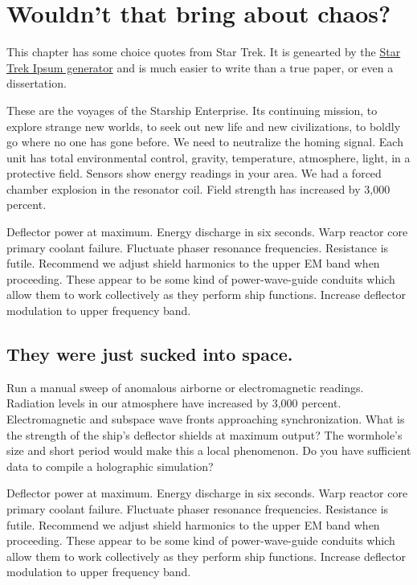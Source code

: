 
\chapter{Wouldn't that bring about chaos?}\label{chap:ipsum}

This chapter has some choice quotes from Star Trek. 
It is genearted by the \href{http://vlad-saling.github.io/star-trek-ipsum/}{Star Trek Ipsum generator} and is much easier to write than a true paper, or even a dissertation.

These are the voyages of the Starship Enterprise. Its continuing mission, to explore strange new worlds, to seek out new life and new civilizations, to boldly go where no one has gone before. We need to neutralize the homing signal. Each unit has total environmental control, gravity, temperature, atmosphere, light, in a protective field. Sensors show energy readings in your area. We had a forced chamber explosion in the resonator coil. Field strength has increased by 3,000 percent.

Deflector power at maximum. Energy discharge in six seconds. Warp reactor core primary coolant failure. Fluctuate phaser resonance frequencies. Resistance is futile. Recommend we adjust shield harmonics to the upper EM band when proceeding. These appear to be some kind of power-wave-guide conduits which allow them to work collectively as they perform ship functions. Increase deflector modulation to upper frequency band.

\section{They were just sucked into space.}
Run a manual sweep of anomalous airborne or electromagnetic readings. Radiation levels in our atmosphere have increased by 3,000 percent. Electromagnetic and subspace wave fronts approaching synchronization. What is the strength of the ship's deflector shields at maximum output? The wormhole's size and short period would make this a local phenomenon. Do you have sufficient data to compile a holographic simulation?

Deflector power at maximum. Energy discharge in six seconds. Warp reactor core primary coolant failure. Fluctuate phaser resonance frequencies. Resistance is futile. Recommend we adjust shield harmonics to the upper EM band when proceeding. These appear to be some kind of power-wave-guide conduits which allow them to work collectively as they perform ship functions. Increase deflector modulation to upper frequency band.

